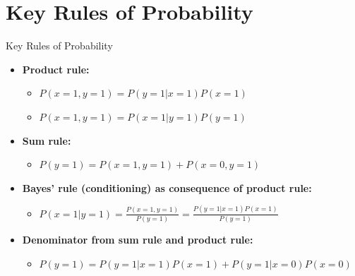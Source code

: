 \documentclass{beamer}
\begin{document}
\section{Key Rules of Probability}

\begin{frame}{Key Rules of Probability}
\begin{itemize}
\item \textbf{Product rule:}
  \begin{itemize}
    \item $P(x = 1, y = 1) = P(y = 1|x = 1)P(x = 1)$
    \item $P(x = 1, y = 1) = P(x = 1|y = 1)P(y = 1)$
  \end{itemize}
\item \textbf{Sum rule:}
  \begin{itemize}
  \item $P(y = 1) = P(x = 1, y = 1) + P(x = 0, y = 1)$
  \end{itemize}
\item \textbf{Bayes' rule (conditioning) as consequence of product rule:}
  \begin{itemize}
    \item $P(x = 1|y = 1) = \frac{P(x = 1, y = 1)}{P(y = 1)} = \frac{P(y = 1|x = 1)P(x = 1)}{P(y = 1)}$
  \end{itemize}
\item \textbf{Denominator from sum rule and product rule:}
  \begin{itemize}
    \item $P(y = 1) = P(y = 1|x = 1)P(x = 1) + P(y = 1|x = 0)P(x = 0)$
    \end{itemize}
\end{itemize}
\end{frame}
\end{document}
